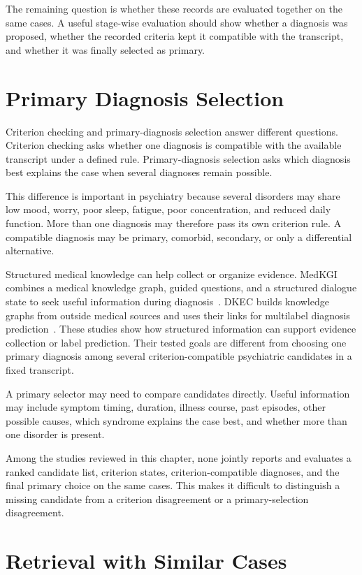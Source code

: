 The remaining question is whether these records are evaluated together on the same cases. A useful stage-wise evaluation should show whether a diagnosis was proposed, whether the recorded criteria kept it compatible with the transcript, and whether it was finally selected as primary.

\section{Primary Diagnosis Selection}

Criterion checking and primary-diagnosis selection answer different questions. Criterion checking asks whether one diagnosis is compatible with the available transcript under a defined rule. Primary-diagnosis selection asks which diagnosis best explains the case when several diagnoses remain possible.

This difference is important in psychiatry because several disorders may share low mood, worry, poor sleep, fatigue, poor concentration, and reduced daily function. More than one diagnosis may therefore pass its own criterion rule. A compatible diagnosis may be primary, comorbid, secondary, or only a differential alternative.

Structured medical knowledge can help collect or organize evidence. MedKGI combines a medical knowledge graph, guided questions, and a structured dialogue state to seek useful information during diagnosis~\citep{wang2025medkgi}. DKEC builds knowledge graphs from outside medical sources and uses their links for multilabel diagnosis prediction~\citep{ge2024dkec}. These studies show how structured information can support evidence collection or label prediction. Their tested goals are different from choosing one primary diagnosis among several criterion-compatible psychiatric candidates in a fixed transcript.

A primary selector may need to compare candidates directly. Useful information may include symptom timing, duration, illness course, past episodes, other possible causes, which syndrome explains the case best, and whether more than one disorder is present.

Among the studies reviewed in this chapter, none jointly reports and evaluates a ranked candidate list, criterion states, criterion-compatible diagnoses, and the final primary choice on the same cases. This makes it difficult to distinguish a missing candidate from a criterion disagreement or a primary-selection disagreement.

\section{Retrieval with Similar Cases}

